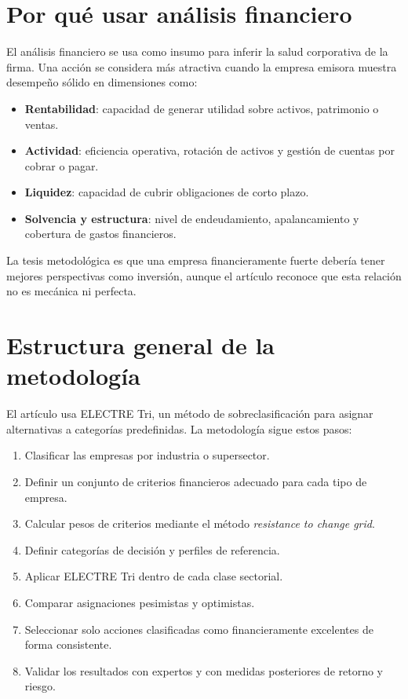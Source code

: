 \documentclass[11pt,a4paper]{article}
\begin{document}
\section{Por qué usar análisis financiero}

El análisis financiero se usa como insumo para inferir la salud corporativa de la firma. Una acción se considera más atractiva cuando la empresa emisora muestra desempeño sólido en dimensiones como:

\begin{itemize}[leftmargin=*]
    \item \textbf{Rentabilidad}: capacidad de generar utilidad sobre activos, patrimonio o ventas.
    \item \textbf{Actividad}: eficiencia operativa, rotación de activos y gestión de cuentas por cobrar o pagar.
    \item \textbf{Liquidez}: capacidad de cubrir obligaciones de corto plazo.
    \item \textbf{Solvencia y estructura}: nivel de endeudamiento, apalancamiento y cobertura de gastos financieros.
\end{itemize}

La tesis metodológica es que una empresa financieramente fuerte debería tener mejores perspectivas como inversión, aunque el artículo reconoce que esta relación no es mecánica ni perfecta.

\section{Estructura general de la metodología}

El artículo usa ELECTRE Tri, un método de sobreclasificación para asignar alternativas a categorías predefinidas. La metodología sigue estos pasos:

\begin{enumerate}[leftmargin=*]
    \item Clasificar las empresas por industria o supersector.
    \item Definir un conjunto de criterios financieros adecuado para cada tipo de empresa.
    \item Calcular pesos de criterios mediante el método \textit{resistance to change grid}.
    \item Definir categorías de decisión y perfiles de referencia.
    \item Aplicar ELECTRE Tri dentro de cada clase sectorial.
    \item Comparar asignaciones pesimistas y optimistas.
    \item Seleccionar solo acciones clasificadas como financieramente excelentes de forma consistente.
    \item Validar los resultados con expertos y con medidas posteriores de retorno y riesgo.
\end{enumerate}
\end{document}
